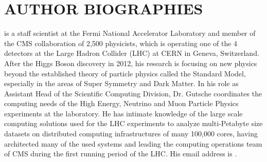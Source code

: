\documentclass{wscpaperproc}
\theoremstyle{wsc}
\begin{document}
\section*{AUTHOR BIOGRAPHIES}

 is a staff scientist at the Fermi National Accelerator Laboratory and member of the CMS collaboration of 2,500 physicists, which is operating one of the 4 detectors at the Large Hadron Collider (LHC) at CERN in Geneva, Switzerland. After the Higgs Boson discovery in 2012, his research is focusing on new physics beyond the established theory of particle physics called the Standard Model, especially in the areas of Super Symmetry and Dark Matter. In his role as Assistant Head of the Scientific Computing Division, Dr. Gutsche coordinates the computing needs of the High Energy, Neutrino and Muon Particle Physics experiments at the laboratory. He has intimate knowledge of the large scale computing solutions used for the LHC experiments to analyze multi-Petabyte size datasets on distributed computing infrastructures of many 100,000 cores, having architected many of the used systems and leading the computing operations team of CMS during the first running period of the LHC. His email address is .\\
\end{document}
